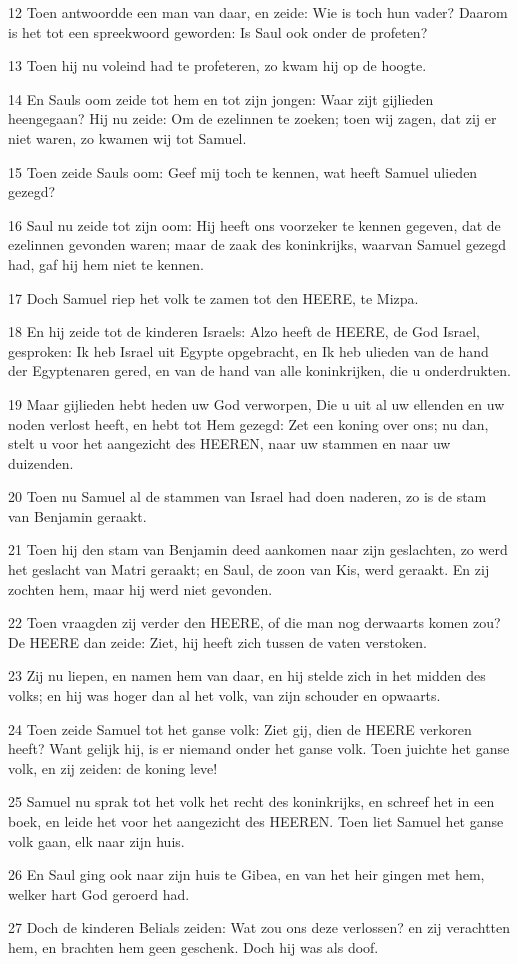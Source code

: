 \par 12 Toen antwoordde een man van daar, en zeide: Wie is toch hun vader? Daarom is het tot een spreekwoord geworden: Is Saul ook onder de profeten?
\par 13 Toen hij nu voleind had te profeteren, zo kwam hij op de hoogte.
\par 14 En Sauls oom zeide tot hem en tot zijn jongen: Waar zijt gijlieden heengegaan? Hij nu zeide: Om de ezelinnen te zoeken; toen wij zagen, dat zij er niet waren, zo kwamen wij tot Samuel.
\par 15 Toen zeide Sauls oom: Geef mij toch te kennen, wat heeft Samuel ulieden gezegd?
\par 16 Saul nu zeide tot zijn oom: Hij heeft ons voorzeker te kennen gegeven, dat de ezelinnen gevonden waren; maar de zaak des koninkrijks, waarvan Samuel gezegd had, gaf hij hem niet te kennen.
\par 17 Doch Samuel riep het volk te zamen tot den HEERE, te Mizpa.
\par 18 En hij zeide tot de kinderen Israels: Alzo heeft de HEERE, de God Israel, gesproken: Ik heb Israel uit Egypte opgebracht, en Ik heb ulieden van de hand der Egyptenaren gered, en van de hand van alle koninkrijken, die u onderdrukten.
\par 19 Maar gijlieden hebt heden uw God verworpen, Die u uit al uw ellenden en uw noden verlost heeft, en hebt tot Hem gezegd: Zet een koning over ons; nu dan, stelt u voor het aangezicht des HEEREN, naar uw stammen en naar uw duizenden.
\par 20 Toen nu Samuel al de stammen van Israel had doen naderen, zo is de stam van Benjamin geraakt.
\par 21 Toen hij den stam van Benjamin deed aankomen naar zijn geslachten, zo werd het geslacht van Matri geraakt; en Saul, de zoon van Kis, werd geraakt. En zij zochten hem, maar hij werd niet gevonden.
\par 22 Toen vraagden zij verder den HEERE, of die man nog derwaarts komen zou? De HEERE dan zeide: Ziet, hij heeft zich tussen de vaten verstoken.
\par 23 Zij nu liepen, en namen hem van daar, en hij stelde zich in het midden des volks; en hij was hoger dan al het volk, van zijn schouder en opwaarts.
\par 24 Toen zeide Samuel tot het ganse volk: Ziet gij, dien de HEERE verkoren heeft? Want gelijk hij, is er niemand onder het ganse volk. Toen juichte het ganse volk, en zij zeiden: de koning leve!
\par 25 Samuel nu sprak tot het volk het recht des koninkrijks, en schreef het in een boek, en leide het voor het aangezicht des HEEREN. Toen liet Samuel het ganse volk gaan, elk naar zijn huis.
\par 26 En Saul ging ook naar zijn huis te Gibea, en van het heir gingen met hem, welker hart God geroerd had.
\par 27 Doch de kinderen Belials zeiden: Wat zou ons deze verlossen? en zij verachtten hem, en brachten hem geen geschenk. Doch hij was als doof.

